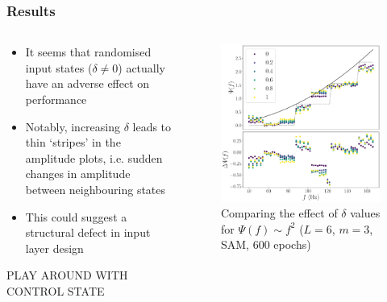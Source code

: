 \documentclass{beamer}
\begin{document}
\begin{frame}
\frametitle{Results}
\begin{columns}
\begin{column}{0.5\textwidth}
\begin{itemize}
\item It seems that randomised input states ($\delta \neq 0$) actually have an \alert{adverse effect} on performance
\item Notably, increasing $\delta$ leads to \alert{thin `stripes'} in the amplitude plots, i.e. sudden changes in amplitude between neighbouring states 
\item This could suggest a structural \alert{defect in input layer design} 
\end{itemize}
PLAY AROUND WITH CONTROL STATE
\end{column}
\begin{column}{0.5\textwidth}
\begin{figure}
\centering 
\includegraphics[width=\textwidth]{im/psi_comp_delta}
\caption{Comparing the effect of $\delta$ values for $\Psi(f) \sim f^2$ ($L=6$, $m=3$, SAM, 600 epochs)}
\end{figure}
\end{column}
\end{columns}


\end{frame}
\end{document}
